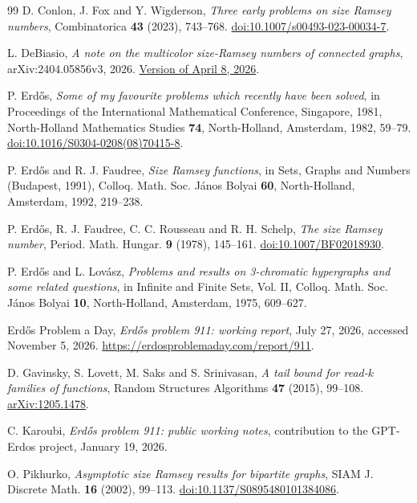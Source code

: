 \documentclass[11pt]{amsart}
\theoremstyle{definition}
\theoremstyle{remark}
\numberwithin{equation}{section}
\begin{document}
\clearpage
\begin{thebibliography}{99}
D. Conlon, J. Fox and Y. Wigderson,
\emph{Three early problems on size Ramsey numbers},
Combinatorica \textbf{43} (2023), 743--768.
\href{https://doi.org/10.1007/s00493-023-00034-7}{doi:10.1007/s00493-023-00034-7}.

L. DeBiasio,
\emph{A note on the multicolor size-Ramsey numbers of connected graphs},
arXiv:2404.05856v3, 2026.
\href{https://arxiv.org/abs/2404.05856v3}{Version of April 8, 2026}.

P. Erd\H{o}s,
\emph{Some of my favourite problems which recently have been solved},
in Proceedings of the International Mathematical Conference,
Singapore, 1981, North-Holland Mathematics Studies \textbf{74},
North-Holland, Amsterdam, 1982, 59--79.
\href{https://doi.org/10.1016/S0304-0208(08)70415-8}{doi:10.1016/S0304-0208(08)70415-8}.

P. Erd\H{o}s and R. J. Faudree,
\emph{Size Ramsey functions},
in Sets, Graphs and Numbers (Budapest, 1991),
Colloq. Math. Soc. J\'anos Bolyai \textbf{60},
North-Holland, Amsterdam, 1992, 219--238.

P. Erd\H{o}s, R. J. Faudree, C. C. Rousseau and R. H. Schelp,
\emph{The size Ramsey number},
Period. Math. Hungar. \textbf{9} (1978), 145--161.
\href{https://doi.org/10.1007/BF02018930}{doi:10.1007/BF02018930}.

P. Erd\H{o}s and L. Lov\'asz,
\emph{Problems and results on 3-chromatic hypergraphs and some related questions},
in Infinite and Finite Sets, Vol. II,
Colloq. Math. Soc. J\'anos Bolyai \textbf{10}, North-Holland,
Amsterdam, 1975, 609--627.

Erd\H{o}s Problem a Day,
\emph{Erd\H{o}s problem 911: working report},
July 27, 2026, accessed November 5, 2026.
\url{https://erdosproblemaday.com/report/911}.

D. Gavinsky, S. Lovett, M. Saks and S. Srinivasan,
\emph{A tail bound for read-$k$ families of functions},
Random Structures Algorithms \textbf{47} (2015), 99--108.
\href{https://arxiv.org/abs/1205.1478}{arXiv:1205.1478}.

C. Karoubi,
\emph{Erd\H{o}s problem 911: public working notes},
contribution to the GPT-Erdos project, January 19, 2026.

O. Pikhurko,
\emph{Asymptotic size Ramsey results for bipartite graphs},
SIAM J. Discrete Math. \textbf{16} (2002), 99--113.
\href{https://doi.org/10.1137/S0895480101384086}{doi:10.1137/S0895480101384086}.
\end{thebibliography}
\end{document}
